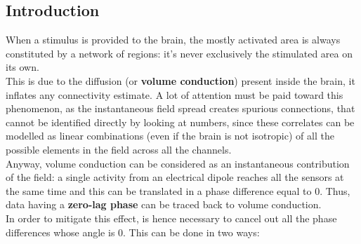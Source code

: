 \subsection{Introduction}
When a stimulus is provided to the brain, the mostly activated area is always constituted by a network
of regions: it's never exclusively the stimulated area on its own.\\
This is due to the diffusion (or \textbf{volume conduction}) present inside the brain, it inflates any
connectivity estimate. A lot of attention must be paid toward this phenomenon, as the instantaneous
field spread creates spurious connections, that cannot be identified directly by looking at numbers,
since these correlates can be modelled as linear combinations (even if the brain is not isotropic) of
all the possible elements in the field across all the channels.\\
Anyway, volume conduction can be considered as an instantaneous contribution of the field: a single
activity from an electrical dipole reaches all the sensors at the same time and this can be translated
in a phase difference equal to 0. Thus, data having a \textbf{zero-lag phase} can be traced back to
volume conduction.\\
In order to mitigate this effect, is hence necessary to cancel out all the phase differences whose
angle is 0. This can be done in two ways:
